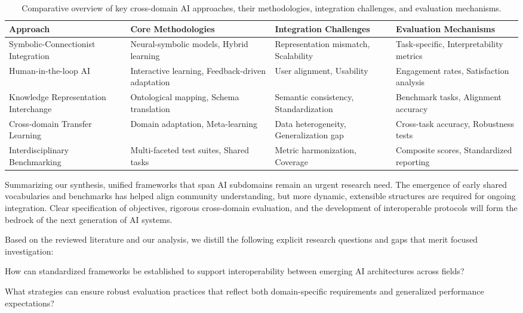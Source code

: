 \documentclass[sigconf]{acmart}
\begin{document}
\begin{table*}[htbp]
\centering
\caption{Comparative overview of key cross-domain AI approaches, their methodologies, integration challenges, and evaluation mechanisms.}
\label{tab:crossdomain-overview}
\begin{adjustbox}{max width=\textwidth}
\begin{tabular}{@{}llll@{}}
\toprule
Approach & Core Methodologies & Integration Challenges & Evaluation Mechanisms \\
\midrule
Symbolic-Connectionist Integration & Neural-symbolic models, Hybrid learning & Representation mismatch, Scalability & Task-specific, Interpretability metrics \\
Human-in-the-loop AI & Interactive learning, Feedback-driven adaptation & User alignment, Usability & Engagement rates, Satisfaction analysis \\
Knowledge Representation Interchange & Ontological mapping, Schema translation & Semantic consistency, Standardization & Benchmark tasks, Alignment accuracy \\
Cross-domain Transfer Learning & Domain adaptation, Meta-learning & Data heterogeneity, Generalization gap & Cross-task accuracy, Robustness tests \\
Interdisciplinary Benchmarking & Multi-faceted test suites, Shared tasks & Metric harmonization, Coverage & Composite scores, Standardized reporting \\
\bottomrule
\end{tabular}
\end{adjustbox}
\end{table*}

Summarizing our synthesis, unified frameworks that span AI subdomains remain an urgent research need. The emergence of early shared vocabularies and benchmarks has helped align community understanding, but more dynamic, extensible structures are required for ongoing integration. Clear specification of objectives, rigorous cross-domain evaluation, and the development of interoperable protocols will form the bedrock of the next generation of AI systems.

Based on the reviewed literature and our analysis, we distill the following explicit research questions and gaps that merit focused investigation:

How can standardized frameworks be established to support interoperability between emerging AI architectures across fields?

What strategies can ensure robust evaluation practices that reflect both domain-specific requirements and generalized performance expectations?
\end{document}
